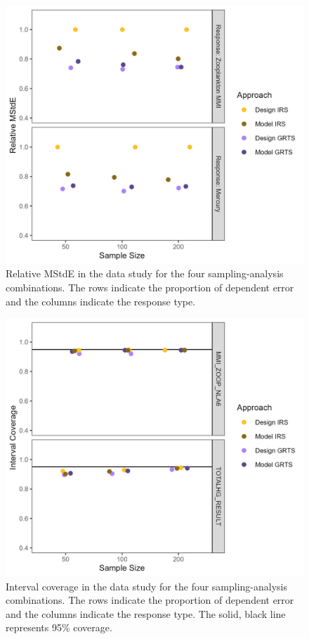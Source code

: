\documentclass[]{elsarticle} %
\begin{document}
\begin{figure}
  \centering
  \includegraphics[width = 1\linewidth]{figures/data_mse_eff.jpeg}
  \caption{Relative MStdE in the data study for the four sampling-analysis combinations. The rows indicate the proportion of dependent error and the columns indicate the response type.}
  \label{fig:data_mse_eff}
\end{figure}

\begin{figure}
  \centering
  \includegraphics[width = 1\linewidth]{figures/data_coverage.jpeg}
  \caption{Interval coverage in the data study for the four sampling-analysis combinations. The rows indicate the proportion of dependent error and the columns indicate the response type. The solid, black line represents 95\% coverage.}
  \label{fig:data_figconf}
\end{figure}
\end{document}
